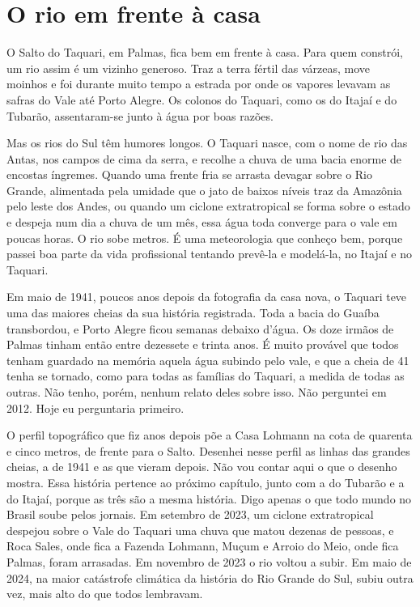 \documentclass[
  brazilian,
  11pt,
  openany]{book}
\begin{document}
\section{O rio em frente à casa}\label{o-rio-em-frente-uxe0-casa}

O Salto do Taquari, em Palmas, fica bem em frente à casa. Para quem
constrói, um rio assim é um vizinho generoso. Traz a terra fértil das
várzeas, move moinhos e foi durante muito tempo a estrada por onde os
vapores levavam as safras do Vale até Porto Alegre. Os colonos do
Taquari, como os do Itajaí e do Tubarão, assentaram-se junto à água por
boas razões.

Mas os rios do Sul têm humores longos. O Taquari nasce, com o nome de
rio das Antas, nos campos de cima da serra, e recolhe a chuva de uma
bacia enorme de encostas íngremes. Quando uma frente fria se arrasta
devagar sobre o Rio Grande, alimentada pela umidade que o jato de baixos
níveis traz da Amazônia pelo leste dos Andes, ou quando um ciclone
extratropical se forma sobre o estado e despeja num dia a chuva de um
mês, essa água toda converge para o vale em poucas horas. O rio sobe
metros. É uma meteorologia que conheço bem, porque passei boa parte da
vida profissional tentando prevê-la e modelá-la, no Itajaí e no Taquari.

Em maio de 1941, poucos anos depois da fotografia da casa nova, o
Taquari teve uma das maiores cheias da sua história registrada. Toda a
bacia do Guaíba transbordou, e Porto Alegre ficou semanas debaixo
d'água. Os doze irmãos de Palmas tinham então entre dezessete e trinta
anos. É muito provável que todos tenham guardado na memória aquela água
subindo pelo vale, e que a cheia de 41 tenha se tornado, como para todas
as famílias do Taquari, a medida de todas as outras. Não tenho, porém,
nenhum relato deles sobre isso. Não perguntei em 2012. Hoje eu
perguntaria primeiro.

O perfil topográfico que fiz anos depois põe a Casa Lohmann na cota de
quarenta e cinco metros, de frente para o Salto. Desenhei nesse perfil
as linhas das grandes cheias, a de 1941 e as que vieram depois. Não vou
contar aqui o que o desenho mostra. Essa história pertence ao próximo
capítulo, junto com a do Tubarão e a do Itajaí, porque as três são a
mesma história. Digo apenas o que todo mundo no Brasil soube pelos
jornais. Em setembro de 2023, um ciclone extratropical despejou sobre o
Vale do Taquari uma chuva que matou dezenas de pessoas, e Roca Sales,
onde fica a Fazenda Lohmann, Muçum e Arroio do Meio, onde fica Palmas,
foram arrasadas. Em novembro de 2023 o rio voltou a subir. Em maio de
2024, na maior catástrofe climática da história do Rio Grande do Sul,
subiu outra vez, mais alto do que todos lembravam.
\end{document}
